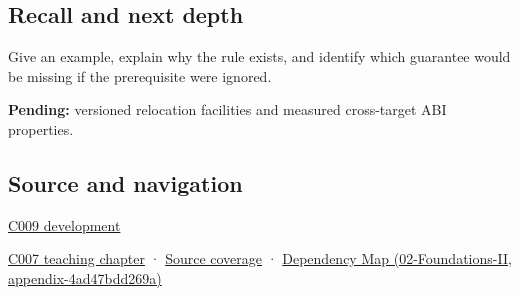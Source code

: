 \subsection{Recall and next depth}\label{recall-and-next-depth}

Give an example, explain why the rule exists, and identify which guarantee would be missing if the prerequisite were ignored.

\textbf{Pending:} versioned relocation facilities and measured cross-target ABI properties.

\subsection{Source and navigation}\label{source-and-navigation}

\hyperref[appendix-fd090d982a15]{C009 development}

\href{Continuous\%20Notes/Computing\%20Foundations\%20-\%20From\%20Bits\%20to\%20C++\%20and\%20Systems\%20APIs\#Bringing\%20the\%20object\%20model\%20back\%20to\%20bytes}{C007 teaching chapter} · \hyperref[appendix-fd090d982a15]{Source coverage} · \href{}{Dependency Map (02-Foundations-II, appendix-4ad47bdd269a)}
